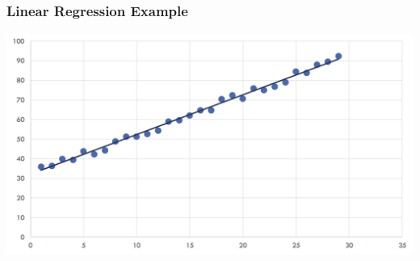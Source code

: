 
\newcommand\here{lalala}
\newcommand\dis{\displaystyle }


\subsection{}
\begin{frame}
  \frametitle{Linear Regression Example}
  \includegraphics[scale=0.32]{pics/linear.png}

\end{frame}


